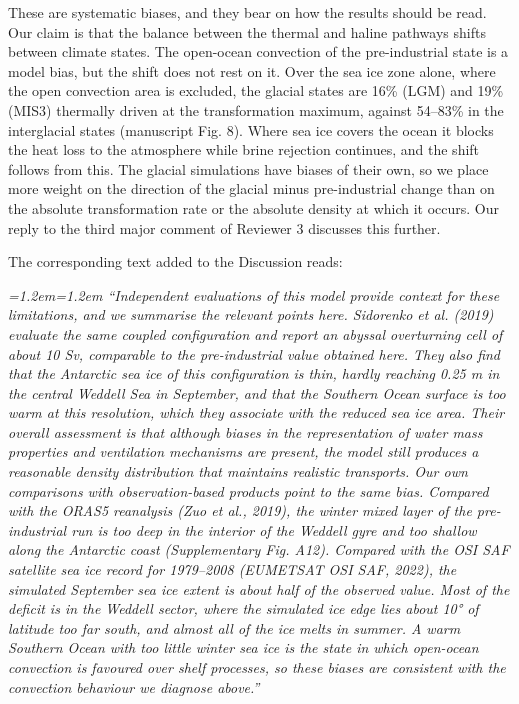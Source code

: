 \documentclass[11pt,a4paper]{article}
\newenvironment{change}{\par\smallskip\color{chgcol}\small\itshape\leftskip=1.2em\rightskip=1.2em\noindent\ignorespaces}{\par\smallskip}
\begin{document}
These are systematic biases, and they bear on how the results should be read. Our claim is that the balance between the thermal and haline pathways shifts between climate states. The open-ocean convection of the pre-industrial state is a model bias, but the shift does not rest on it. Over the sea ice zone alone, where the open convection area is excluded, the glacial states are 16\% (LGM) and 19\% (MIS3) thermally driven at the transformation maximum, against 54--83\% in the interglacial states (manuscript Fig. 8). Where sea ice covers the ocean it blocks the heat loss to the atmosphere while brine rejection continues, and the shift follows from this. The glacial simulations have biases of their own, so we place more weight on the direction of the glacial minus pre-industrial change than on the absolute transformation rate or the absolute density at which it occurs. Our reply to the third major comment of Reviewer 3 discusses this further.


The corresponding text added to the Discussion reads:

\begin{change}
``Independent evaluations of this model provide context for these limitations, and we summarise the relevant points here. Sidorenko et al. (2019) evaluate the same coupled configuration and report an abyssal overturning cell of about 10 Sv, comparable to the pre-industrial value obtained here. They also find that the Antarctic sea ice of this configuration is thin, hardly reaching 0.25 m in the central Weddell Sea in September, and that the Southern Ocean surface is too warm at this resolution, which they associate with the reduced sea ice area. Their overall assessment is that although biases in the representation of water mass properties and ventilation mechanisms are present, the model still produces a reasonable density distribution that maintains realistic transports. Our own comparisons with observation-based products point to the same bias. Compared with the ORAS5 reanalysis (Zuo et al., 2019), the winter mixed layer of the pre-industrial run is too deep in the interior of the Weddell gyre and too shallow along the Antarctic coast (Supplementary Fig. A12). Compared with the OSI SAF satellite sea ice record for 1979--2008 (EUMETSAT OSI SAF, 2022), the simulated September sea ice extent is about half of the observed value. Most of the deficit is in the Weddell sector, where the simulated ice edge lies about 10° of latitude too far south, and almost all of the ice melts in summer. A warm Southern Ocean with too little winter sea ice is the state in which open-ocean convection is favoured over shelf processes, so these biases are consistent with the convection behaviour we diagnose above.''
\end{change}
\end{document}
